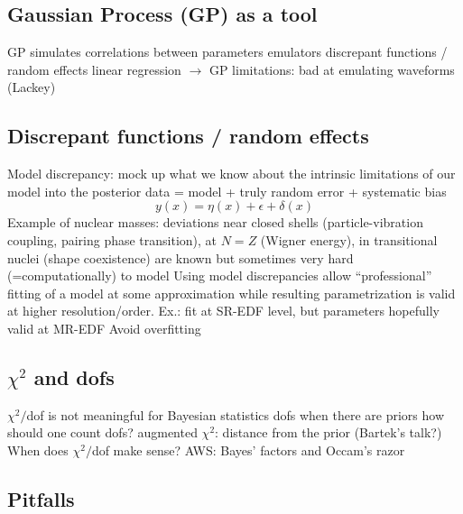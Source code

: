 \subsection{Gaussian Process (GP) as a tool}  \label{subsec:GP_tool}

\bi
  \I GP simulates correlations between parameters
  \I emulators
  \I discrepant functions / random effects 
  \I linear regression $\rightarrow$ GP
  \I limitations: bad at emulating waveforms (Lackey)
\ei

\subsection{Discrepant functions / random effects}  \label{subsec:discrepant}

\bi
  \I Model discrepancy: mock up what we know about the intrinsic limitations of 
     our model into the posterior
  \I data = model + truly random error + systematic bias
  $$ y(x) = \eta(x) + \epsilon + \delta(x) $$
  \I Example of nuclear masses: deviations near closed shells (particle-vibration 
     coupling, pairing phase transition), at $N=Z$ (Wigner energy), in transitional 
     nuclei (shape coexistence) are known but sometimes very hard (=computationally) 
     to model
  \I Using model discrepancies allow ``professional'' fitting of a model at some 
     approximation while resulting parametrization is valid at higher resolution/order.
     Ex.: fit at SR-EDF level, but parameters hopefully valid at MR-EDF
  \I Avoid overfitting
\ei

\subsection{\texorpdfstring{$\chi^2$}{chi-squared} and dofs}  \label{subsec:}

   \bi 
       \I $\chi^2/$dof is not meaningful for Bayesian statistics
       \I dofs when there are priors
       \I how should one count dofs?
       \I augmented $\chi^2$: distance from the prior (Bartek's talk?)
       \I When does $\chi^2/$dof make sense?
       \I AWS: Bayes' factors and Occam's razor
   \ei    

\subsection{Pitfalls}  \label{subsec:pitfalls}

